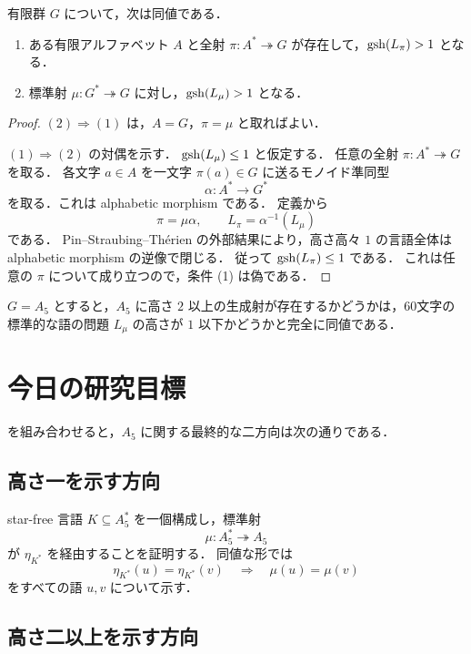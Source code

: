 \begin{proposition}[全要素アルファベットへの集約]\label{prop:canonical}
有限群 $G$ について，次は同値である．
\begin{enumerate}
\item ある有限アルファベット $A$ と全射 $\pi:A^*\twoheadrightarrow G$ が存在して，$\operatorname{gsh}(L_\pi)>1$ となる．
\item 標準射 $\mu:G^*\twoheadrightarrow G$ に対し，$\operatorname{gsh}(L_\mu)>1$ となる．
\end{enumerate}
\end{proposition}

\begin{proof}
$(2)\Rightarrow(1)$ は，$A=G$，$\pi=\mu$ と取ればよい．

$(1)\Rightarrow(2)$ の対偶を示す．
$\operatorname{gsh}(L_\mu)\leq1$ と仮定する．
任意の全射 $\pi:A^*\twoheadrightarrow G$ を取る．
各文字 $a\in A$ を一文字 $\pi(a)\in G$ に送るモノイド準同型
\[
\alpha:A^*\to G^*
\]
を取る．これは alphabetic morphism である．
定義から
\[
\pi=\mu\alpha,
\qquad
L_\pi=\alpha^{-1}(L_\mu)
\]
である．
Pin--Straubing--Th\'erien の外部結果により，高さ高々 $1$ の言語全体は alphabetic morphism の逆像で閉じる．
従って $\operatorname{gsh}(L_\pi)\leq1$ である．
これは任意の $\pi$ について成り立つので，条件 (1) は偽である．
\end{proof}

$G=A_5$ とすると，$A_5$ に高さ $2$ 以上の生成射が存在するかどうかは，60文字の標準的な語の問題 $L_\mu$ の高さが $1$ 以下かどうかと完全に同値である．

\section{今日の研究目標}

 を組み合わせると，$A_5$ に関する最終的な二方向は次の通りである．

\subsection*{高さ一を示す方向}

star-free 言語 $K\subseteq A_5^*$ を一個構成し，標準射
\[
\mu:A_5^*\twoheadrightarrow A_5
\]
が $\eta_{K^*}$ を経由することを証明する．
同値な形では
\[
\eta_{K^*}(u)=\eta_{K^*}(v)
\quad\Longrightarrow\quad
\mu(u)=\mu(v)
\]
をすべての語 $u,v$ について示す．

\subsection*{高さ二以上を示す方向}

